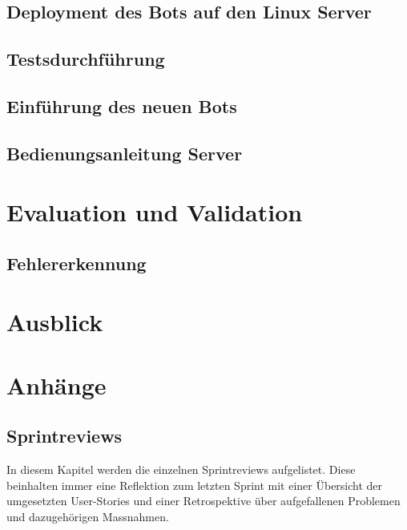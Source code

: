 \documentclass[a4paper, table]{article}
\begin{document}
\newpage
\subsection{Deployment des Bots auf den Linux Server}

\newpage
\subsection{Testsdurchführung}

\newpage
\subsection{Einführung des neuen Bots}

\newpage
\subsection{Bedienungsanleitung Server}

\newpage
\section{Evaluation und Validation}


\subsection{Fehlererkennung}

\section{Ausblick}


\newpage

\section{Anh\"ange}

\subsection{Sprintreviews}\label{Sprintreviews}
In diesem Kapitel werden die einzelnen Sprintreviews aufgelistet.
Diese beinhalten immer eine Reflektion zum letzten Sprint mit einer Übersicht der umgesetzten User-Stories und
einer Retrospektive über aufgefallenen Problemen und dazugehörigen Massnahmen.
\end{document}
